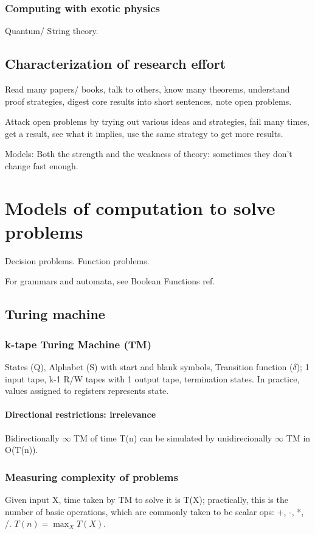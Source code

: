 \documentclass[oneside, article]{memoir}
\begin{document}
\subsection{Computing with exotic physics}
Quantum/ String theory.

\section{Characterization of research effort}
Read many papers/ books, talk to others, know many theorems, understand proof strategies, digest core results into short sentences, note open problems.

Attack open problems by trying out various ideas and strategies, fail many times, get a result, see what it implies, use the same strategy to get more results.

Models: Both the strength and the weakness of theory: sometimes they don't change fast enough.

\chapter{Models of computation to solve problems}
Decision problems. Function problems.

For grammars and automata, see Boolean Functions ref.

\section{Turing machine}
\subsection{k-tape Turing Machine (TM)}
States (Q), Alphabet (S) with start and blank symbols, Transition function ($\delta$); 1 input tape, k-1 R/W tapes with 1 output tape, termination states. In practice, values assigned to registers represents state.

\subsubsection{Directional restrictions: irrelevance}
Bidirectionally $\infty$ TM  of time T(n) can be simulated by unidirecionally $\infty$ TM in O(T(n)).

\subsection{Measuring complexity of problems}
Given input X, time taken by TM to solve it is T(X); practically, this is the number of basic operations, which are commonly taken to be scalar ops: +, -, *, /. $T(n) = \max_X T(X)$.
\end{document}
